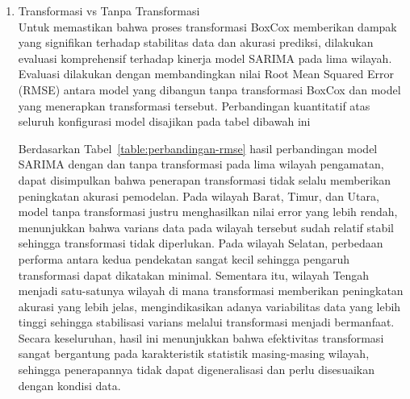\begin{enumerate}[label=\alph*.]
    \item Transformasi vs Tanpa Transformasi \\
    Untuk memastikan bahwa proses transformasi BoxCox memberikan dampak yang signifikan terhadap stabilitas data dan akurasi prediksi, dilakukan evaluasi komprehensif terhadap kinerja model SARIMA pada lima wilayah.
    Evaluasi dilakukan dengan membandingkan nilai Root Mean Squared Error (RMSE) antara model yang dibangun tanpa transformasi BoxCox dan model yang menerapkan transformasi tersebut.
    Perbandingan kuantitatif atas seluruh konfigurasi model disajikan pada tabel dibawah ini
    
    Berdasarkan Tabel~\ref{table:perbandingan-rmse} hasil perbandingan model SARIMA dengan dan tanpa transformasi pada lima wilayah pengamatan, dapat disimpulkan bahwa penerapan transformasi tidak selalu memberikan peningkatan akurasi pemodelan.
    Pada wilayah Barat, Timur, dan Utara, model tanpa transformasi justru menghasilkan nilai error yang lebih rendah, menunjukkan bahwa varians data pada wilayah tersebut sudah relatif stabil sehingga transformasi tidak diperlukan.
    Pada wilayah Selatan, perbedaan performa antara kedua pendekatan sangat kecil sehingga pengaruh transformasi dapat dikatakan minimal.
    Sementara itu, wilayah Tengah menjadi satu-satunya wilayah di mana transformasi memberikan peningkatan akurasi yang lebih jelas, mengindikasikan adanya variabilitas data yang lebih tinggi sehingga stabilisasi varians melalui transformasi menjadi bermanfaat.
    Secara keseluruhan, hasil ini menunjukkan bahwa efektivitas transformasi sangat bergantung pada karakteristik statistik masing-masing wilayah, sehingga penerapannya tidak dapat digeneralisasi dan perlu disesuaikan dengan kondisi data.
\end{enumerate}

